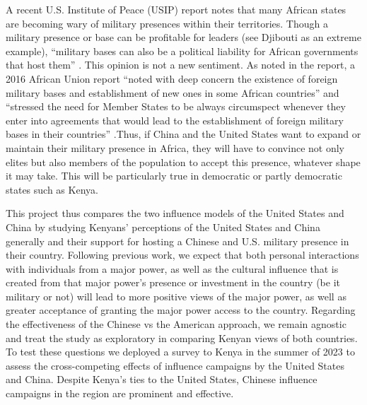 

A recent U.S. Institute of Peace (USIP) report notes that many African states are becoming wary of military presences within their territories. Though a military presence or base can be profitable for leaders (see Djibouti as an extreme example), ``military bases can also be a political liability for African governments that host them'' \cite{usip2024}. This opinion is not a new sentiment. As noted in the report, a 2016 African Union report ``noted with deep concern the existence of foreign military bases and establishment of new ones in some African countries'' and ``stressed the need for Member States to be always circumspect whenever they enter into agreements that would lead to the establishment of foreign military bases in their countries'' \cite{AU2016}.Thus, if China and the United States want to expand or maintain their military presence in Africa, they will have to convince not only elites but also members of the population to accept this presence, whatever shape it may take. This will be particularly true in democratic or partly democratic states such as Kenya. 

This project thus compares the two influence models of the United States and China by studying Kenyans' perceptions of the United States and China generally and their support for hosting a Chinese and U.S. military presence in their country. Following previous work, we expect that both personal interactions with individuals from a major power, as well as the cultural influence that is created from that major power's presence or investment in the country (be it military or not) will lead to more positive views of the major power, as well as greater acceptance of granting the major power access to the country. Regarding the effectiveness of the Chinese vs the American approach, we remain agnostic and treat the study as exploratory in comparing Kenyan views of both countries. To test these questions we deployed a survey to Kenya in the summer of 2023 to assess the cross-competing effects of influence campaigns by the United States and China. Despite Kenya's ties to the United States, Chinese influence campaigns in the region are prominent and effective. 






